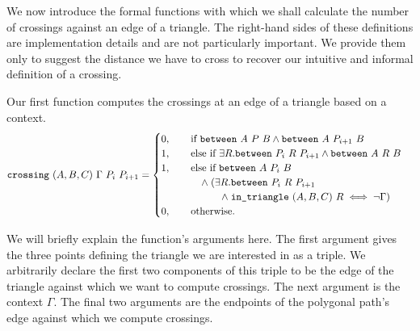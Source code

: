 
We now introduce the formal functions with which we shall calculate the number of crossings against an edge of a triangle. The right-hand sides of these definitions are implementation details and are not particularly important. We provide them only to suggest the distance we have to cross to recover our intuitive and informal definition of a crossing. 

Our first function computes the crossings at an edge of a triangle based on a context.
\begin{equation}\label{eq:oneCrossingDef}
  \texttt{crossing}\ (A,B,C)\ \Gamma\ P_i\ P_{i+1} = 
  \begin{cases}
    0, \qquad\text{if }\texttt{between}\ A\ P\ B\wedge\texttt{between}\ A\ P_{i+1}\ B\\
    1, \qquad\text{else if }\exists R. \texttt{between}\ P_i\ R\ P_{i+1}\wedge\texttt{between}\ A\ R\ B\\
    1, \qquad\text{else if }\texttt{between}\ A\ P_i\ B\\
    \qquad\qquad\wedge\; (\exists R. \texttt{between}\ P_i\ R\ P_{i+1}\\
    \qquad\qquad\qquad\wedge\;\texttt{in\_triangle}\ (A,B,C)\ R \iff \neg\Gamma)\\
    0, \qquad\text{otherwise.}
  \end{cases}
\end{equation}

We will briefly explain the function's arguments here. The first argument gives the three points defining the triangle we are interested in as a triple. We arbitrarily declare the first two components of this triple to be the edge of the triangle against which we want to compute crossings. The next argument is the context $\Gamma$. The final two arguments are the endpoints of the polygonal path's edge against which we compute crossings.


